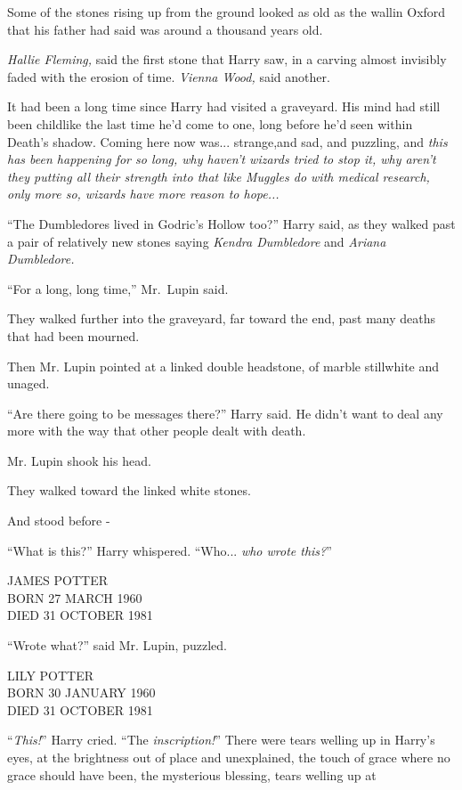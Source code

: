 Some of the stones rising up from the ground looked as old as the wallin Oxford that his father had said was around a thousand years old.

\emph{Hallie Fleming,} said the first stone that Harry saw, in a carving almost invisibly faded with the erosion of time. \emph{Vienna Wood,} said another.

It had been a long time since Harry had visited a graveyard. His mind had still been childlike the last time he'd come to one, long before he'd seen within Death's shadow. Coming here now was... strange,and sad, and puzzling, and \emph{this has been happening for so long, why haven't wizards tried to stop it, why aren't they putting all their strength into that like Muggles do with medical research, only more so, wizards have more reason to hope...}

“The Dumbledores lived in Godric's Hollow too?” Harry said, as they walked past a pair of relatively new stones saying \emph{Kendra Dumbledore} and \emph{Ariana Dumbledore.}

“For a long, long time,” Mr.~Lupin said.

They walked further into the graveyard, far toward the end, past many deaths that had been mourned.

Then Mr. Lupin pointed at a linked double headstone, of marble stillwhite and unaged.

“Are there going to be messages there?” Harry said. He didn't want to deal any more with the way that other people dealt with death.

Mr. Lupin shook his head.

They walked toward the linked white stones.

And stood before -

“What is this?” Harry whispered. “Who... \emph{who wrote this?}”

JAMES POTTER\\ BORN 27 MARCH 1960\\ DIED 31 OCTOBER 1981

“Wrote what?” said Mr. Lupin, puzzled.

LILY POTTER\\ BORN 30 JANUARY 1960\\ DIED 31 OCTOBER 1981

“\emph{This!}” Harry cried. “The \emph{inscription!}” There were tears welling up in Harry's eyes, at the brightness out of place and unexplained, the touch of grace where no grace should have been, the mysterious blessing, tears welling up at

